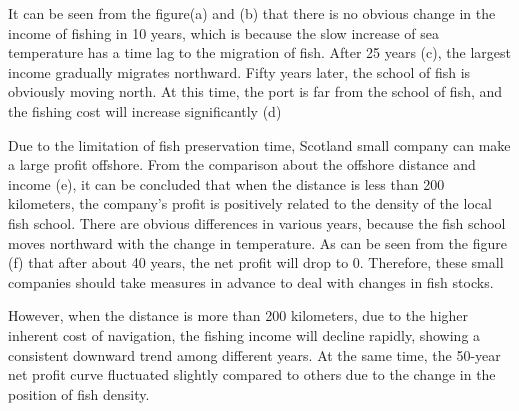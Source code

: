 \documentclass{mcmthesis}
\begin{document}
It can be seen from the figure(a) and (b) that there is no obvious change in the income of fishing in 10 years, which is because the slow increase of sea temperature has a time lag to the migration of fish. After 25 years (c), the largest income gradually migrates northward. Fifty years later, the school of fish is obviously moving north. At this time, the port is far from the school of fish, and the fishing cost will increase significantly (d)

Due to the limitation of fish preservation time,  Scotland small company can make a large profit offshore. From the comparison about the offshore distance and income (e), it can be concluded that when the distance is less than 200 kilometers, the company's profit is positively related to the density of the local fish school. There are obvious differences in various years, because the fish school moves northward with the change in temperature. As can be seen from the figure (f) that after about 40 years, the net profit will drop to 0. Therefore, these small companies should take measures in advance to deal with changes in fish stocks.

However, when the distance is more than 200 kilometers, due to the higher inherent cost of navigation, the fishing income will decline rapidly, showing a consistent downward trend among different years. At the same time, the 50-year net profit  curve fluctuated slightly compared to others due to the change in the position of fish density.
\end{document}
